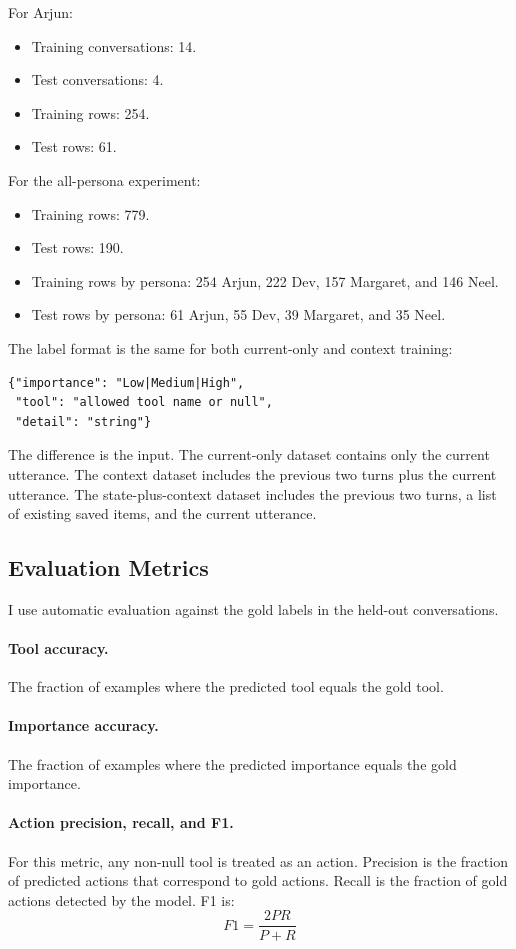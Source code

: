 \documentclass[11pt,a4paper]{article}
\begin{document}
For Arjun:
\begin{itemize}
    \item Training conversations: 14.
    \item Test conversations: 4.
    \item Training rows: 254.
    \item Test rows: 61.
\end{itemize}

For the all-persona experiment:
\begin{itemize}
    \item Training rows: 779.
    \item Test rows: 190.
    \item Training rows by persona: 254 Arjun, 222 Dev, 157 Margaret, and 146 Neel.
    \item Test rows by persona: 61 Arjun, 55 Dev, 39 Margaret, and 35 Neel.
\end{itemize}

The label format is the same for both current-only and context training:
\begin{verbatim}
{"importance": "Low|Medium|High",
 "tool": "allowed tool name or null",
 "detail": "string"}
\end{verbatim}
The difference is the input. The current-only dataset contains only the current utterance. The context dataset includes the previous two turns plus the current utterance. The state-plus-context dataset includes the previous two turns, a list of existing saved items, and the current utterance.

\subsection{Evaluation Metrics}

I use automatic evaluation against the gold labels in the held-out conversations.

\paragraph{Tool accuracy.}
The fraction of examples where the predicted tool equals the gold tool.

\paragraph{Importance accuracy.}
The fraction of examples where the predicted importance equals the gold importance.

\paragraph{Action precision, recall, and F1.}
For this metric, any non-null tool is treated as an action. Precision is the fraction of predicted actions that correspond to gold actions. Recall is the fraction of gold actions detected by the model. F1 is:
\[
F1 = \frac{2PR}{P+R}
\]
\end{document}
